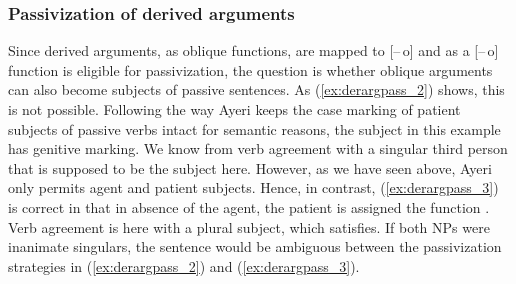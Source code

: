 
\subsubsection{Passivization of derived arguments}

Since derived arguments, as oblique functions, are mapped to \mbox{[–\,o]} and
\Subj{} as a [\mbox{–\,o}] function is eligible for passivization, the question is
whether oblique arguments can also become subjects of passive sentences. As
(\ref{ex:derargpass_2}) shows, this is not possible. Following the way Ayeri
keeps the case marking of patient subjects of passive verbs intact for semantic
reasons, the subject in this example has genitive marking. We know from verb
agreement with a singular third person that  is
supposed to be the subject here. However, as we have seen above, Ayeri only
permits agent and patient subjects. Hence, in contrast, (\ref{ex:derargpass_3})
is correct in that in absence of the agent, the patient is assigned the \Subj{}
function \citep[334]{bresnan2016}. Verb agreement is here with a plural
subject, which  satisfies. If both NPs were
inanimate singulars, the sentence would be ambiguous between the passivization
strategies in (\ref{ex:derargpass_2}) and (\ref{ex:derargpass_3}).

